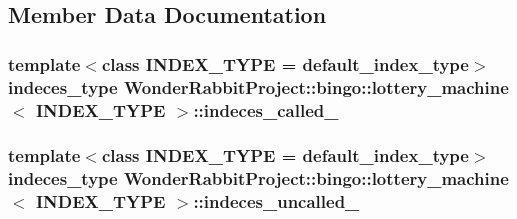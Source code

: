 \subsection{Member Data Documentation}
\hypertarget{structWonderRabbitProject_1_1bingo_1_1lottery__machine_a9614d7348f9dfd37777d860e577f20c1}{
\subsubsection[{indeces\-\_\-called\-\_\-}]{\setlength{\rightskip}{0pt plus 5cm}template$<$class I\-N\-D\-E\-X\-\_\-\-T\-Y\-P\-E  = default\-\_\-index\-\_\-type$>$ indeces\-\_\-type {\bf Wonder\-Rabbit\-Project\-::bingo\-::lottery\-\_\-machine}$<$ I\-N\-D\-E\-X\-\_\-\-T\-Y\-P\-E $>$\-::indeces\-\_\-called\-\_\-\hspace{0.3cm}{\ttfamily [private]}}}\label{structWonderRabbitProject_1_1bingo_1_1lottery__machine_a9614d7348f9dfd37777d860e577f20c1}
\hypertarget{structWonderRabbitProject_1_1bingo_1_1lottery__machine_a20060cafdcdd3bc7685d78258a12f2a7}{
\subsubsection[{indeces\-\_\-uncalled\-\_\-}]{\setlength{\rightskip}{0pt plus 5cm}template$<$class I\-N\-D\-E\-X\-\_\-\-T\-Y\-P\-E  = default\-\_\-index\-\_\-type$>$ indeces\-\_\-type {\bf Wonder\-Rabbit\-Project\-::bingo\-::lottery\-\_\-machine}$<$ I\-N\-D\-E\-X\-\_\-\-T\-Y\-P\-E $>$\-::indeces\-\_\-uncalled\-\_\-\hspace{0.3cm}{\ttfamily [private]}}}\label{structWonderRabbitProject_1_1bingo_1_1lottery__machine_a20060cafdcdd3bc7685d78258a12f2a7}

